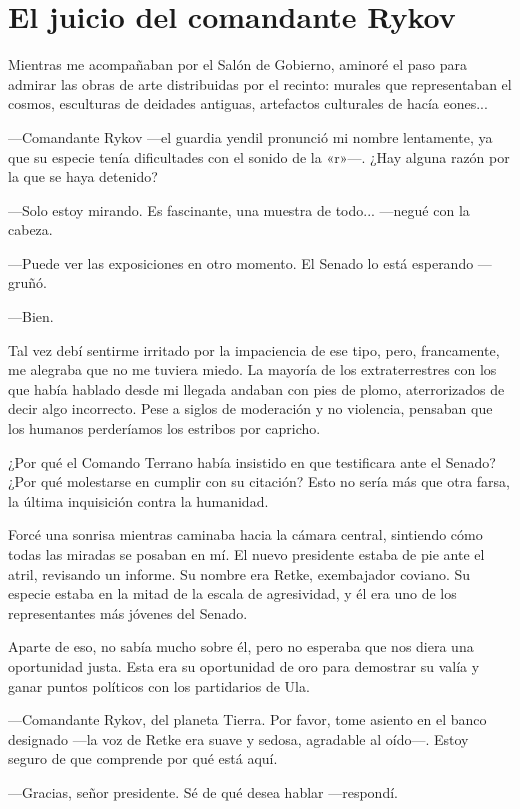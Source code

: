 \chapter{El juicio del comandante Rykov}\label{sec:el-juicio-del-comandante-rykov}

Mientras me acompañaban por el Salón de Gobierno, aminoré el paso para admirar las obras de arte distribuidas por el recinto: murales que representaban el cosmos, esculturas de deidades antiguas, artefactos culturales de hacía eones...

—Comandante Rykov —el guardia yendil pronunció mi nombre lentamente, ya que su especie tenía dificultades con el sonido de la «r»—. ¿Hay alguna razón por la que se haya detenido?

—Solo estoy mirando. Es fascinante, una muestra de todo... —negué con la cabeza.

—Puede ver las exposiciones en otro momento. El Senado lo está esperando —gruñó.

—Bien.

Tal vez debí sentirme irritado por la impaciencia de ese tipo, pero, francamente, me alegraba que no me tuviera miedo. La mayoría de los extraterrestres con los que había hablado desde mi llegada andaban con pies de plomo, aterrorizados de decir algo incorrecto. Pese a siglos de moderación y no violencia, pensaban que los humanos perderíamos los estribos por capricho.

¿Por qué el Comando Terrano había insistido en que testificara ante el Senado? ¿Por qué molestarse en cumplir con su citación? Esto no sería más que otra farsa, la última inquisición contra la humanidad.

Forcé una sonrisa mientras caminaba hacia la cámara central, sintiendo cómo todas las miradas se posaban en mí. El nuevo presidente estaba de pie ante el atril, revisando un informe. Su nombre era Retke, exembajador coviano. Su especie estaba en la mitad de la escala de agresividad, y él era uno de los representantes más jóvenes del Senado.

Aparte de eso, no sabía mucho sobre él, pero no esperaba que nos diera una oportunidad justa. Esta era su oportunidad de oro para demostrar su valía y ganar puntos políticos con los partidarios de Ula.

—Comandante Rykov, del planeta Tierra. Por favor, tome asiento en el banco designado —la voz de Retke era suave y sedosa, agradable al oído—. Estoy seguro de que comprende por qué está aquí.

—Gracias, señor presidente. Sé de qué desea hablar —respondí.

